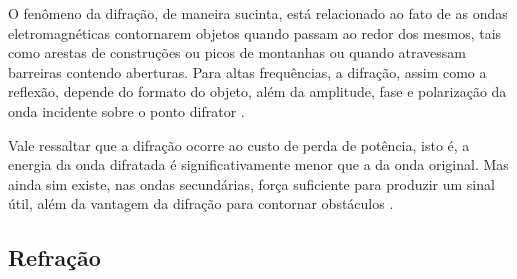 O fenômeno da difração, de maneira sucinta, está relacionado ao fato de as ondas eletromagnéticas contornarem objetos quando passam ao redor dos mesmos, tais como arestas de construções ou picos de montanhas ou quando atravessam barreiras contendo aberturas. Para altas frequências, a difração, assim como a reflexão, depende do formato do objeto, além da amplitude, fase e polarização da onda incidente sobre o ponto difrator \cite{rappaport2009}.
\begin{figure}[H]
	\centering
\end{figure}

Vale ressaltar que a difração ocorre ao custo de perda de potência, isto é, a energia da onda difratada é significativamente menor que a da onda original. Mas ainda sim existe, nas ondas secundárias, força suficiente para produzir um sinal útil, além da vantagem da difração para contornar obstáculos \cite{flickenger2008,rappaport2009}.

\subsection{Refração}
\label{sub:refracao}

